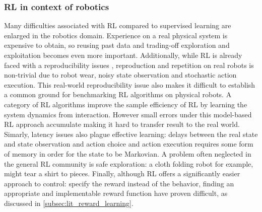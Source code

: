 \documentclass[\home/main.tex]{subfiles}
\begin{document}
\subsubsection{RL in context of robotics}
Many difficulties associated with RL compared to supervised learning are enlarged in the robotics domain.
Experience on a real physical system is expensive to obtain, so reusing past data and trading-off exploration and exploitation becomes even more important.
Additionally, while RL is already faced with a reproducibility issues \autocite{henderson2018deep}, reproduction and repetition on real robots is non-trivial due to robot wear, noisy state observation and stochastic action execution. This real-world reproducibility issue also makes it difficult to establish a common ground for benchmarking RL algorithms on physical robots.
A category of RL algorithms improve the sample efficiency of RL by learning the system dynamics from interaction. However small errors under this model-based RL approach accumulate making it hard to transfer result to the real world.
Simarly, latency issues also plague effective learning: delays between the real state and state observation and action choice and action execution requires some form of memory in order for the state to be Markovian.
A problem often neglected in the general RL community is safe exploration: a cloth folding robot for example, might tear a shirt to pieces.
Finally, although RL offers a significantly easier approach to control: specify the reward instead of the behavior, finding an appropriate and implementable reward function have proven difficult, as discussed in \cref{subsec:lit_reward_learning}.

\end{document}
